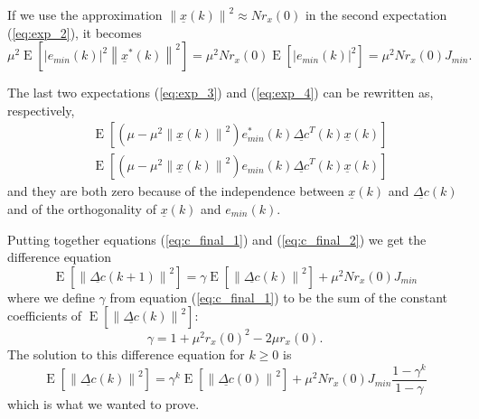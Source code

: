 \documentclass[a4paper,oneside]{article}
\renewcommand{\vec}[1]{\underline{#1}}
\newcommand{\E}[1]{\operatorname{E}\left[#1\right]}
\newcommand{\norm}[1]{\left\lVert#1\right\rVert}
\newcommand{\abs}[1]{\left|#1\right|}
\begin{document}
If we use the approximation $\norm{\vec{x}(k)}^2 \approx Nr_x(0)$ in
the second expectation (\ref{eq:exp_2}), it becomes
\begin{equation}
\mu^2 \E{\abs{e_{min}(k)}^2 \norm{\vec{x}^*(k)}^2}
= \mu^2Nr_x(0)\E{\abs{e_{min}(k)}^2}
= \mu^2Nr_x(0)J_{min} .
\label{eq:c_final_2}
\end{equation}

The last two expectations (\ref{eq:exp_3}) and (\ref{eq:exp_4}) can be
rewritten as, respectively,
\begin{align*}
  & \E{\left(\mu - \mu^2\norm{\vec{x}(k)}^2\right) e_{min}^*(k) \vec{\Delta c}^T(k)\vec{x}(k)} \\
  & \E{\left(\mu - \mu^2\norm{\vec{x}(k)}^2\right) e_{min}(k) \vec{\Delta c}^T(k)\vec{x}(k)}
\end{align*}
and they are both zero because of the independence between $\vec{x}(k)$
and $\vec{\Delta c}(k)$ and of the orthogonality of $\vec{x}(k)$ and
$e_{min}(k)$.

Putting together equations (\ref{eq:c_final_1}) and
(\ref{eq:c_final_2}) we get the difference equation
\begin{equation}
  \E{\norm{\vec{\Delta c}(k+1)}^2} = \gamma \E{\norm{\vec{\Delta
        c}(k)}^2} + \mu^2Nr_x(0)J_{min}
\end{equation}
where we define $\gamma$ from equation (\ref{eq:c_final_1}) to be 
the sum of the constant coefficients of $\E{\norm{\vec{\Delta c}(k)}^2}$:
\[ \gamma = 1 + \mu^2r_x(0)^2 - 2\mu r_x(0) . \]
The solution to this difference equation for $k \geq 0$ is
\begin{equation}
  \E{\norm{\vec{\Delta c}(k)}^2} =
  \gamma^k \E{\norm{\vec{\Delta c}(0)}^2} +
  \mu^2Nr_x(0)J_{min} \frac{1 - \gamma^k}{1 - \gamma}
\end{equation}
which is what we wanted to prove.
\end{document}
